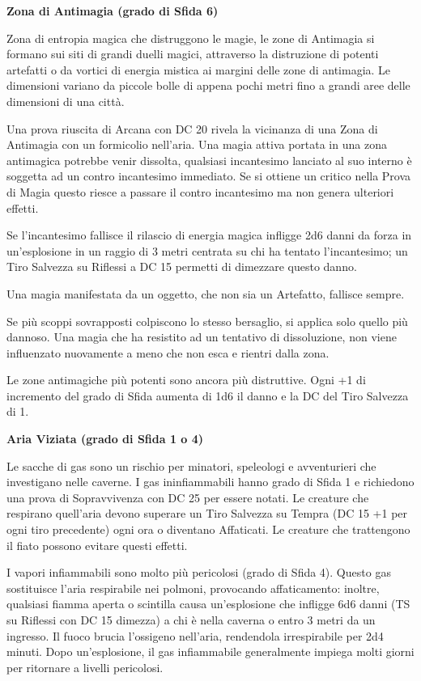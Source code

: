 \begin{multicols}{2}
\textbf{Zona di Antimagia (grado di Sfida 6)}

Zona di entropia magica che distruggono le magie, le zone di Antimagia si formano sui siti di grandi duelli magici, attraverso la distruzione di potenti artefatti o da vortici di energia mistica ai margini delle zone di antimagia. Le dimensioni variano da piccole bolle di appena pochi metri fino a grandi aree delle dimensioni di una città.

Una prova riuscita di Arcana con DC 20 rivela la vicinanza di una Zona di Antimagia con un formicolio nell'aria. Una magia attiva portata in una zona antimagica potrebbe venir dissolta, qualsiasi incantesimo lanciato al suo interno è soggetta ad un contro incantesimo immediato. Se si ottiene un critico nella Prova di Magia questo riesce a passare il contro incantesimo ma non genera ulteriori effetti.

Se l'incantesimo fallisce il rilascio di energia magica infligge 2d6 danni da forza in un'esplosione in un raggio di 3 metri centrata su chi ha tentato l'incantesimo; un Tiro Salvezza su Riflessi a DC 15 permetti di dimezzare questo danno.

Una magia manifestata da un oggetto, che non sia un Artefatto, fallisce sempre.

Se più scoppi sovrapposti colpiscono lo stesso bersaglio, si applica solo quello più dannoso. Una magia che ha resistito ad un tentativo di dissoluzione, non viene influenzato nuovamente a meno che non esca e rientri dalla zona.

Le zone antimagiche più potenti sono ancora più distruttive. Ogni +1 di incremento del grado di Sfida aumenta di 1d6 il danno e la DC del Tiro Salvezza di 1.

\medskip
\textbf{Aria Viziata (grado di Sfida 1 o 4)}

Le sacche di gas sono un rischio per minatori, speleologi e avventurieri che investigano nelle caverne. I gas ininfiammabili hanno grado di Sfida 1 e richiedono una prova di Sopravvivenza con DC 25 per essere notati. Le creature che respirano quell'aria devono superare un Tiro Salvezza su Tempra (DC 15 +1 per ogni tiro precedente) ogni ora o diventano Affaticati. Le creature che trattengono il fiato possono evitare questi effetti.

I vapori infiammabili sono molto più pericolosi (grado di Sfida 4). Questo gas sostituisce l'aria respirabile nei polmoni, provocando affaticamento: inoltre, qualsiasi fiamma aperta o scintilla causa un'esplosione che infligge 6d6 danni (TS su Riflessi con DC 15 dimezza) a chi è nella caverna o entro 3 metri da un ingresso. Il fuoco brucia l'ossigeno nell'aria, rendendola irrespirabile per 2d4 minuti. Dopo un'esplosione, il gas infiammabile generalmente impiega molti giorni per ritornare a livelli pericolosi.


\end{multicols}

